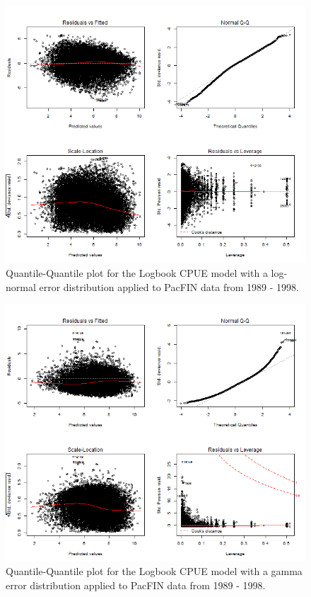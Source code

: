 \documentclass[12pt,]{article}
\begin{document}
\FloatBarrier

\newpage

\begin{figure}[htbp]
\centering
\includegraphics{Figures/Logbook_CPUE/GLMdiagnosticslognormal_B500.png}
\caption{Quantile-Quantile plot for the Logbook CPUE model with a
log-normal error distribution applied to PacFIN data from 1989 - 1998.
\label{fig:Logbook_lognormal}}
\end{figure}

\begin{figure}[htbp]
\centering
\includegraphics{Figures/Logbook_CPUE/GLMdiagnosticsgamma_B500.png}
\caption{Quantile-Quantile plot for the Logbook CPUE model with a gamma
error distribution applied to PacFIN data from 1989 - 1998.
\label{fig:Logbook_gamma}}
\end{figure}
\end{document}
